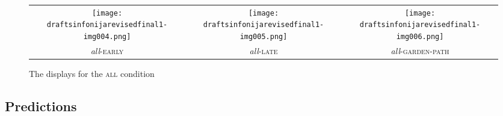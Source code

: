 \documentclass[output=paper]{langscibook}
\begin{document}



\begin{figure}[h]\small
\begin{tabularx}{\textwidth}{CCC}
\texttt{[image: draftsinfonijarevisedfinal1-img004.png]}&\texttt{[image: draftsinfonijarevisedfinal1-img005.png]}&\texttt{[image: draftsinfonijarevisedfinal1-img006.png]}\\
\textit{all}-\textsc{early}&\textit{all}-\textsc{late}&\textit{all}-\textsc{garden-path}\\
\end{tabularx}
\caption{The displays for the \textsc{all} condition}
    \label{tom:fig:all}
\end{figure}



\subsection{Predictions} \label{tom:Predictions}
\end{document}
